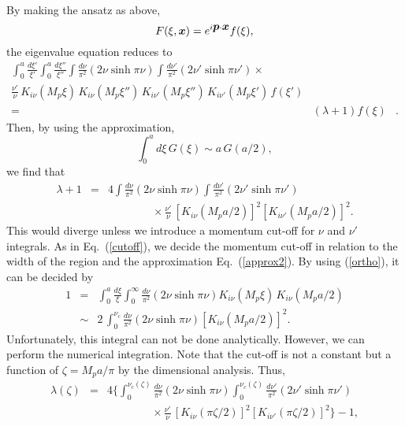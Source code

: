 \documentclass[12pt,epsf]{article}
\def\bmi#1{\mbox{\boldmath $#1$}}
\begin{document}
By making the ansatz as above,
\begin{equation}
  F(\xi,\bmi{x}) = e^{i\bmi{p}\cdot\bmi{x}} f(\xi),
\end{equation}
the eigenvalue equation reduces to
\begin{eqnarray}
 \int^a_0 \frac{d\xi'}{\xi'} \int^a_0 \frac{d\xi''}{\xi''}
  \int\frac{d\nu}{\pi^2}  (2\nu\sinh\pi\nu)
\int\frac{d\nu'}{\pi^2} (2\nu'\sinh\pi\nu')  \times 
 & &  \nonumber \\
\frac{\nu'}{\nu}\,
  K_{i\nu}(M_p\xi)\,K_{i\nu}(M_p\xi'')\,
   K_{i\nu'}(M_p\xi'')\,K_{i\nu'}(M_p\xi')\, f(\xi')
 & &   \nonumber \\
= &(\lambda+1)f(\xi)  & .
\end{eqnarray}
Then, by using the approximation,
\begin{equation}
  \int^a_0 d\xi\, G(\xi) \sim a\,G(a/2),
\label{approx2}
\end{equation}
we find that
\begin{eqnarray}
 \lambda+1 &=& 4\int\frac{d\nu}{\pi^2}(2\nu\sinh\pi\nu)
\int\frac{d\nu'}{\pi^2} (2\nu'\sinh\pi\nu') \nonumber \\
  &  & \qquad\qquad{}\times \frac{\nu'}{\nu}\,
\left[K_{i\nu}(M_pa/2)\right]^2
\left[K_{i\nu'}(M_pa/2)\right]^2 .
\end{eqnarray}
This would diverge unless we introduce a momentum cut-off for
$\nu$ and $\nu'$ integrals.
As in Eq.~(\ref{cutoff}),
we decide the momentum cut-off in relation to
the width of the region
and the approximation Eq.~(\ref{approx2}).
By using (\ref{ortho}), it can be decided by
\begin{eqnarray}
 1&=&\int^a_0 \frac{d\xi}{\xi} 
    \int^\infty_0 \frac{d\nu}{\pi^2}(2\nu\sinh\pi\nu) 
    K_{i\nu}(M_p\xi)\,K_{i\nu}(M_pa/2)\nonumber \\
  &\sim & 2\,\int^{\nu_c}_0 \frac{d\nu}{\pi^2}(2\nu\sinh\pi\nu) 
    \left[K_{i\nu}(M_pa/2)\right]^2.
\end{eqnarray}
Unfortunately, this integral can not be done analytically.
However, we can perform the numerical integration.
Note that the cut-off is not a constant but a function 
of $\zeta=M_pa/\pi$ by the dimensional analysis.
Thus,
\begin{eqnarray}
  \lambda(\zeta)&=&4\Biggl\{\int^{\nu_c(\zeta)}_0
     \frac{d\nu}{\pi^2}(2\nu\sinh\pi\nu)
   \int^{\nu_c(\zeta)}_0\frac{d\nu'}{\pi^2} (2\nu'\sinh\pi\nu') 
   \nonumber \\ 
  &  & 
  \qquad\qquad{}\times \frac{\nu'}{\nu}\,
 \left[K_{i\nu}(\pi\zeta/2)\right]^2
  \left[K_{i\nu'}(\pi\zeta/2)\right]^2\Biggr\}-1 ,
\end{eqnarray}
\end{document}
